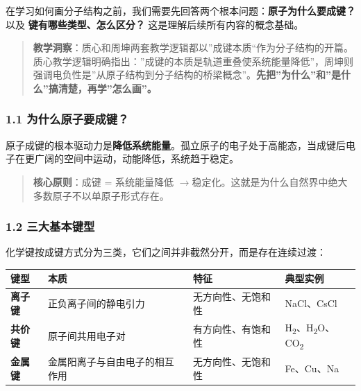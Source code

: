 \documentclass[a4paper,11pt]{ctexart}
\newcounter{none}
\newcommand{\箭}{\ensuremath{\rightarrow}}
\newcommand{\左箭}{\ensuremath{\leftarrow}}
\newcommand{\上箭}{\ensuremath{\uparrow}}
\newcommand{\下箭}{\ensuremath{\downarrow}}
\newcommand{\衡}{\ensuremath{\rightleftharpoons}}
\newcommand{\双箭}{\ensuremath{\leftrightarrow}}
\newcommand{\约等于}{\ensuremath{\approx}}
\newcommand{\小于等于}{\ensuremath{\leq}}
\newcommand{\大于等于}{\ensuremath{\geq}}
\newcommand{\不等于}{\ensuremath{\neq}}
\newcommand{\西格马}{\ensuremath{\sigma}}
\newcommand{\派}{\ensuremath{\pi}}
\begin{document}
在学习如何画分子结构之前，我们需要先回答两个根本问题：\textbf{原子为什么要成键？} 以及 \textbf{键有哪些类型、怎么区分？} 这是理解后续所有内容的概念基础。

\begin{quote}
\textbf{教学洞察}：质心和周坤两套教学逻辑都以''成键本质``作为分子结构的开篇。质心教学逻辑明确指出：''成键的本质是轨道重叠使系统能量降低''，周坤则强调电负性是''从原子结构到分子结构的桥梁概念''。\textbf{先把''为什么''和''是什么''搞清楚，再学''怎么画''。}
\end{quote}

\subsubsection{1.1 为什么原子要成键？}\label{ux4e3aux4ec0ux4e48ux539fux5b50ux8981ux6210ux952e}

原子成键的根本驱动力是\textbf{降低系统能量}。孤立原子的电子处于高能态，当成键后电子在更广阔的空间中运动，动能降低，系统趋于稳定。

\begin{quote}
\textbf{核心原则}：成键 = 系统能量降低 \箭 稳定化。这就是为什么自然界中绝大多数原子不以单原子形式存在。
\end{quote}

\subsubsection{1.2 三大基本键型}\label{ux4e09ux5927ux57faux672cux952eux578b}

化学键按成键方式分为三类，它们之间并非截然分开，而是存在连续过渡：

{\def\LTcaptype{none} %
\begin{longtable}[]{@{}
  >{\raggedright\arraybackslash}p{}
  >{\raggedright\arraybackslash}p{}
  >{\raggedright\arraybackslash}p{}
  >{\raggedright\arraybackslash}p{}@{}}
\toprule\noalign{}
\begin{minipage}[b]{\linewidth}\raggedright
键型
\end{minipage} & \begin{minipage}[b]{\linewidth}\raggedright
本质
\end{minipage} & \begin{minipage}[b]{\linewidth}\raggedright
特征
\end{minipage} & \begin{minipage}[b]{\linewidth}\raggedright
典型实例
\end{minipage} \\
\midrule\noalign{}
\endhead
\bottomrule\noalign{}
\endlastfoot
\textbf{离子键} & 正负离子间的静电引力 & 无方向性、无饱和性 & NaCl、CsCl \\
\textbf{共价键} & 原子间共用电子对 & 有方向性、有饱和性 & H\textsubscript{2}、H\textsubscript{2}O、CO\textsubscript{2} \\
\textbf{金属键} & 金属阳离子与自由电子的相互作用 & 无方向性、无饱和性 & Fe、Cu、Na \\
\end{longtable}
}
\end{document}

